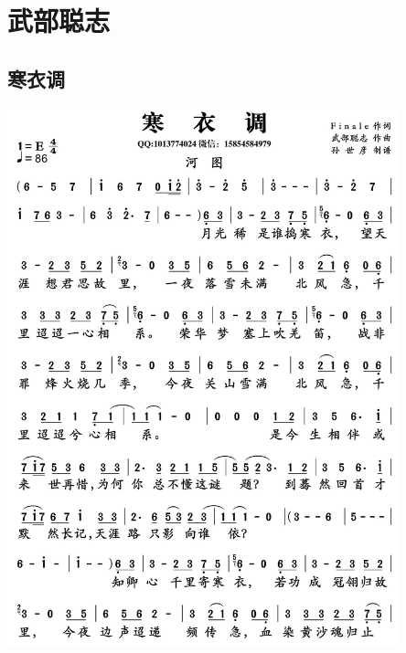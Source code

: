 \documentclass[cn,pad,twocol]{elegantbook}
\begin{document}
\chapter{武部聪志}
\section{寒衣调} \includegraphics[width=0.85\textwidth]{macos/2020武部聪志-寒衣调.jpg}
\end{document}
